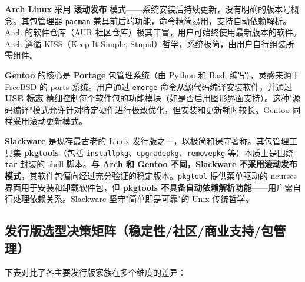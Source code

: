 \documentclass[12pt,UTF8]{ctexbook}
\begin{document}
\textbf{Arch Linux} 采用 \textbf{滚动发布} 模式——系统安装后持续更新，没有明确的版本号概念。其包管理器 \texttt{pacman} 兼具前后端功能，命令精简易用，支持自动依赖解析。Arch 的软件仓库（AUR 社区仓库）极其丰富，用户可始终使用最新版本的软件。Arch 遵循 KISS（Keep It Simple, Stupid）哲学，系统极简，由用户自行组装所需组件。
	
\textbf{Gentoo} 的核心是 \textbf{Portage} 包管理系统（由 Python 和 Bash 编写），灵感来源于 FreeBSD 的 ports 系统。用户通过 \texttt{emerge} 命令从源代码编译安装软件，并通过 \textbf{USE 标志} 精细控制每个软件包的功能模块（如是否启用图形界面支持）。这种"源码编译"模式允许针对特定硬件进行极致优化，但安装和更新耗时较长。Gentoo 同样采用滚动更新模式。
	
\textbf{Slackware} 是现存最古老的 Linux 发行版之一，以极简和保守著称。其包管理工具集 \textbf{pkgtools}（包括 \texttt{installpkg}、\texttt{upgradepkg}、\texttt{removepkg} 等）本质上是围绕 \texttt{tar} 封装的 shell 脚本。\textbf{与 Arch 和 Gentoo 不同，Slackware 不采用滚动发布模式}，其软件包偏向经过充分验证的稳定版本。\texttt{pkgtool} 提供菜单驱动的 ncurses 界面用于安装和卸载软件包，但 \textbf{pkgtools 不具备自动依赖解析功能}——用户需自行处理依赖关系。Slackware 坚守"简单即是可靠"的 Unix 传统哲学。
	
\subsection{发行版选型决策矩阵（稳定性/社区/商业支持/包管理）}
	
下表对比了各主要发行版家族在多个维度的差异：
	
\end{document}
